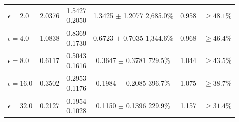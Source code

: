 \begin{table}[!t]
{\begin{tabular}{lccccc}
\addlinespace[2pt]
$\epsilon = 2.0$ & 2.0376 & \makecell{1.5427 \\ 0.2050} & \makecell{1.3425 $\pm$ 1.2077 \\ \scriptsize 2,685.0\%} & 0.958 & $\ge 48.1\%$ \\
\addlinespace[2pt]
$\epsilon = 4.0$ & 1.0838 & \makecell{0.8369 \\ 0.1730} & \makecell{0.6723 $\pm$ 0.7035 \\ \scriptsize 1,344.6\%} & 0.968 & $\ge 46.4\%$ \\
\addlinespace[2pt]
$\epsilon = 8.0$ & 0.6117 & \makecell{0.5043 \\ 0.1616} & \makecell{0.3647 $\pm$ 0.3781 \\ \scriptsize 729.5\%} & 1.044 & $\ge 43.5\%$ \\
\addlinespace[2pt]
$\epsilon = 16.0$ & 0.3502 & \makecell{0.2953 \\ 0.1176} & \makecell{0.1984 $\pm$ 0.2085 \\ \scriptsize 396.7\%} & 1.075 & $\ge 38.7\%$ \\
\addlinespace[2pt]
$\epsilon = 32.0$ & 0.2127 & \makecell{0.1954 \\ 0.1028} & \makecell{0.1150 $\pm$ 0.1396 \\ \scriptsize 229.9\%} & 1.157 & $\ge 31.4\%$ \\
\bottomrule
\end{tabular}%
}
\end{table}
